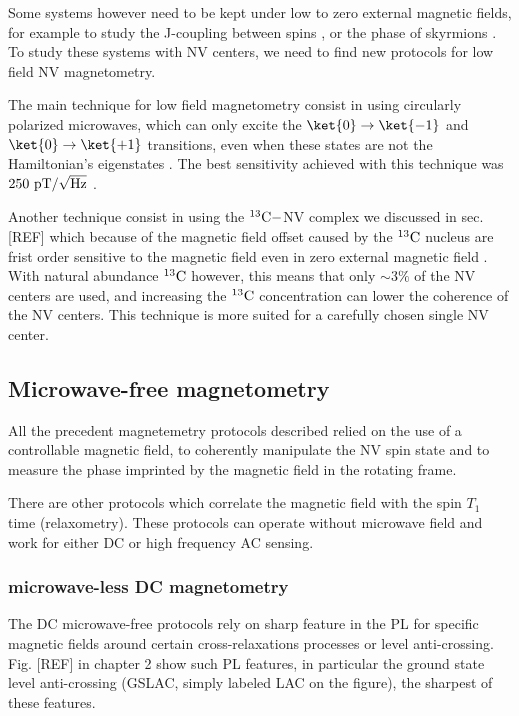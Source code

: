 \documentclass[a4paper,11pt]{report}
\begin{document}
\begin{refsection}
Some systems however need to be kept under low to zero external magnetic fields, for example to study the J-coupling between spins \citep{sutter2012computational}, or the phase of skyrmions \citep{zazvorka2020skyrmion}. To study these systems with NV centers, we need to find new protocols for low field NV magnetometry.

The main technique for low field magnetometry consist in using circularly polarized microwaves, which can only excite the $\ket{0} \to \ket{-1}$ and $\ket{0} \to \ket{+1}$ transitions, even when these states are not the Hamiltonian's eigenstates \citep{mrozek2015circularly, zheng2019zero, lenz2021magnetic, vetter2022zero}. The best sensitivity achieved with this technique was $250\ \rm pT/\sqrt{\rm Hz}$ \citep{zheng2019zero}.

Another technique consist in using the $^{13}\rm{C}-$NV complex we discussed in sec. [REF] which because of the magnetic field offset caused by the $^{13}\rm{C}$ nucleus are frist order sensitive to the magnetic field even in zero external magnetic field \citep{wang2022zero}. With natural abundance $^{13}\rm{C}$ however, this means that only $\sim 3\%$ of the NV centers are used, and increasing the $^{13}\rm{C}$ concentration can lower the coherence of the NV centers. This technique is more suited for a carefully chosen single NV center.

\subsection{Microwave-free magnetometry}
All the precedent magnetemetry protocols described relied on the use of a controllable magnetic field, to coherently manipulate the NV spin state and to measure the phase imprinted by the magnetic field in the rotating frame.

There are other protocols which correlate the magnetic field with the spin $T_1$ time (relaxometry). These protocols can operate without microwave field and work for either DC or high frequency AC sensing.

\subsubsection{microwave-less DC magnetometry}
The DC microwave-free protocols rely on sharp feature in the PL for specific magnetic fields around certain cross-relaxations processes or level anti-crossing. Fig. [REF] in chapter 2 show such PL features, in particular the ground state level anti-crossing (GSLAC, simply labeled LAC on the figure), the sharpest of these features.


\end{refsection}
\end{document}
